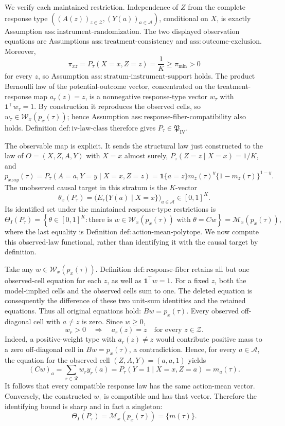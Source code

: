 We verify each maintained restriction.  Independence of \(Z\) from the complete response type \(((A(z))_{z\in\mathcal Z},(Y(a))_{a\in\mathcal A})\), conditional on \(X\), is exactly Assumption \(\mathrm{ass{:}instrument\text{-}randomization}\).  The two displayed observation equations are Assumptions \(\mathrm{ass{:}treatment\text{-}consistency}\) and \(\mathrm{ass{:}outcome\text{-}exclusion}\).  Moreover,
\[
 \pi_{xz}=P_\tau(X=x,Z=z)=\frac1K\geq\pi_{\min}>0
\]
for every \(z\), so Assumption \(\mathrm{ass{:}stratum\text{-}instrument\text{-}support}\) holds.  The product Bernoulli law of the potential-outcome vector, concentrated on the treatment-response map \(a_r(z)=z\), is a nonnegative response-type vector \(w_\tau\) with \(\mathbf1^\top w_\tau=1\).  By construction it reproduces the observed cells, so \(w_\tau\in\mathcal W_x(p_x(\tau))\); hence Assumption \(\mathrm{ass{:}response\text{-}fiber\text{-}compatibility}\) also holds.  Definition \(\mathrm{def{:}iv\text{-}law\text{-}class}\) therefore gives \(P_\tau\in\mathfrak P_{\mathrm{IV}}\).

The observable map is explicit.  It sends the structural law just constructed to the law of \(O=(X,Z,A,Y)\) with \(X=x\) almost surely, \(P_\tau(Z=z\mid X=x)=1/K\), and
\[
 p_{xzay}(\tau)
 =P_\tau(A=a,Y=y\mid X=x,Z=z)
 =\mathbf1\{a=z\}m_z(\tau)^y\{1-m_z(\tau)\}^{1-y}.
\]
The unobserved causal target in this stratum is the \(K\)-vector
\[
 \theta_x(P_\tau)
 =\bigl(E_\tau\{Y(a)\mid X=x\}\bigr)_{a\in\mathcal A}
 \in[0,1]^K.
\]
Its identified set under the maintained response-type restrictions is
\[
 \Theta_I(P_\tau)
 =\left\{\theta\in[0,1]^K:
       \text{there is }w\in\mathcal W_x(p_x(\tau))\text{ with }\theta=Cw\right\}
 =\mathcal M_x(p_x(\tau)),
\]
where the last equality is Definition \(\mathrm{def{:}action\text{-}mean\text{-}polytope}\).  We now compute this observed-law functional, rather than identifying it with the causal target by definition.

Take any \(w\in\mathcal W_x(p_x(\tau))\).  Definition \(\mathrm{def{:}response\text{-}fiber}\) retains all but one observed-cell equation for each \(z\), as well as \(\mathbf1^\top w=1\).  For a fixed \(z\), both the model-implied cells and the observed cells sum to one.  The deleted equation is consequently the difference of these two unit-sum identities and the retained equations.  Thus all original equations hold: \(Bw=p_x(\tau)\).  Every observed off-diagonal cell with \(a\neq z\) is zero.  Since \(w\geq0\),
\[
 w_r>0\quad\Longrightarrow\quad a_r(z)=z
 \quad\text{for every }z\in\mathcal Z.
\]
Indeed, a positive-weight type with \(a_r(z)\neq z\) would contribute positive mass to a zero off-diagonal cell in \(Bw=p_x(\tau)\), a contradiction.  Hence, for every \(a\in\mathcal A\), the equation for the observed cell \((Z,A,Y)=(a,a,1)\) yields
\[
 (Cw)_a
 =\sum_{r\in\mathcal R}w_r y_r(a)
 =P_\tau(Y=1\mid X=x,Z=a)
 =m_a(\tau).
\]
It follows that every compatible response law has the same action-mean vector.  Conversely, the constructed \(w_\tau\) is compatible and has that vector.  Therefore the identifying bound is sharp and in fact a singleton:
\[
 \Theta_I(P_\tau)=\mathcal M_x(p_x(\tau))=\{m(\tau)\}.
\]

